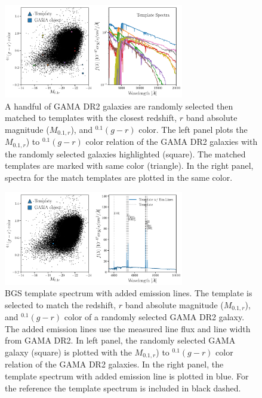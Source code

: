 \documentclass[12pt, letterpaper, preprint]{aastex}
\begin{document}
\begin{figure}
\begin{center}
\includegraphics[width=0.7\textwidth]{figs/GamaLegacy_matchedtempSpectra.pdf}
    \caption{A handful of GAMA DR2 galaxies are randomly selected then 
    matched to templates with the closest redshift, $r$ band absolute 
    magnitude ($M_{0.1,r}$), and $^{0.1}(g - r)$ color. The left panel
    plots the $M_{0.1,r}$) to $^{0.1}(g - r)$ color relation of the GAMA
    DR2 galaxies with the randomly selected galaxies highlighted (square). 
    The matched templates are marked with same color (triangle). In the 
    right panel, spectra for the match templates are plotted in the same 
    color.}
\label{fig:temp_spectra}
\end{center}
\end{figure}

\begin{figure}
\begin{center}
\includegraphics[width=0.7\textwidth]{figs/GLeg_EmLineSpectra.pdf}
    \caption{BGS template spectrum with added emission lines. The 
    template is selected to match the redshift, $r$ band absolute 
    magnitude ($M_{0.1,r}$), and $^{0.1}(g - r)$ color of a randomly 
    selected GAMA DR2 galaxy. The added emission lines use the 
    measured line flux and line width from GAMA DR2. In left panel, 
    the randomly selected GAMA galaxy (square) is plotted with the 
    $M_{0.1,r}$) to $^{0.1}(g - r)$ color relation of the GAMA
    DR2 galaxies. In the right panel, the template spectrum with added
    emission line is plotted in blue. For the reference the template 
    spectrum is included in black dashed.}
\label{fig:emline_temp_spectra}
\end{center}
\end{figure}
\end{document}
